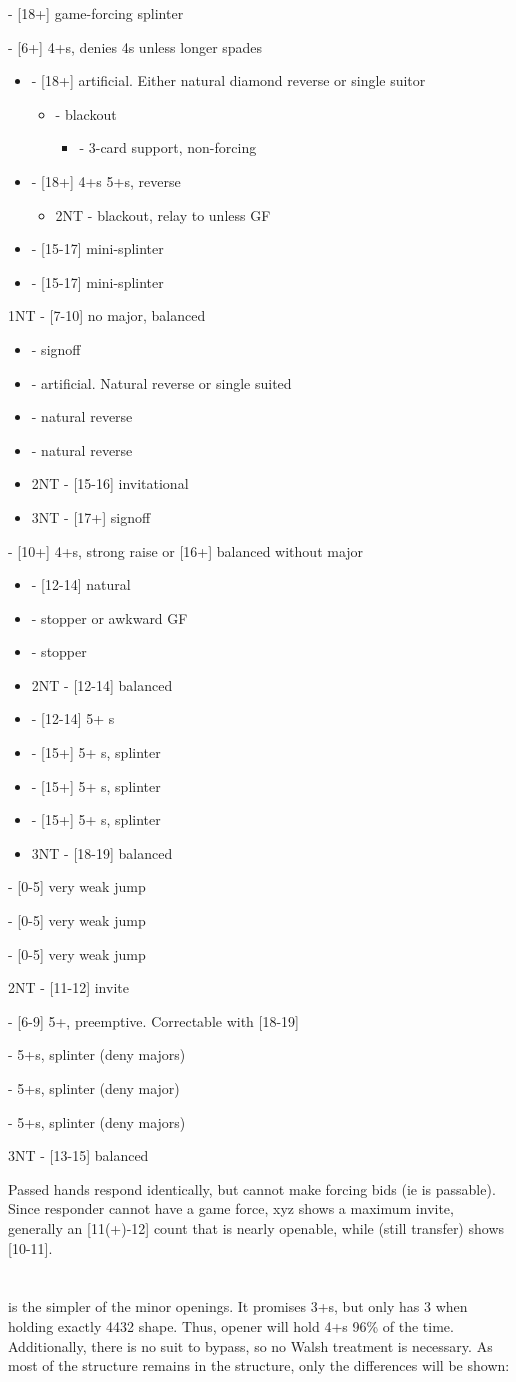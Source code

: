 \documentclass[12pt]{report}
\newcommand{\q}[1]{\multido{}{#1}{\qquad}}
\newcommand{\ul}[1]{\begin{itemize}#1\end{itemize}}
\newcommand{\li}[1]{\item[~] \q{#1}}
\newcommand{\bidsection}[2]{\section{\texorpdfstring{#1}{#2}}}
\begin{document}
\begin{center}
{{            \li0  - [18+] game-forcing splinter
        }
        \li0  - [6+] 4+\sp{}s, denies 4\he{}s unless longer spades
        \ul {
            \li0  - [18+] artificial.  Either natural diamond reverse or single suitor
            \ul {
                \li0 \he2 - blackout
                \ul {
                    \li0 \sp2 - 3-card support, non-forcing
                }
            }
            \li0 \he2 - [18+] 4+\he{}s 5+\cl{}s, reverse
            \ul {
                \li0 2NT - blackout, relay to \cl3 unless GF
            }
            \li0 \di3 - [15-17] mini-splinter
            \li0 \he3 - [15-17] mini-splinter
        }
        \li0 1NT - [7-10] no major, balanced
        \ul {
            \li0  - signoff
            \li0  - artificial.  Natural reverse or single suited
            \li0 \he2 - natural reverse
            \li0 \sp2 - natural reverse
            \li0 2NT - [15-16] invitational
            \li0 3NT - [17+] signoff
            

        }
        \li0  - [10+] 4+\cl{}s, strong raise or [16+] balanced without major
        \ul {
            \li0  - [12-14] natural
            \li0 \he2 - stopper or awkward GF
            \li0 \sp2 - stopper
            \li0 2NT - [12-14] balanced
            \li0 \cl3 - [12-14] 5+ \cl{}s
            \li0 \di3 - [15+] 5+ \cl{}s, splinter
            \li0 \he3 - [15+] 5+ \cl{}s, splinter
            \li0 \sp3 - [15+] 5+ \cl{}s, splinter
            \li0 3NT - [18-19] balanced
        }

        \li0  - [0-5] very weak jump
        \li0  - [0-5] very weak jump
        \li0  - [0-5] very weak jump
        \li0 2NT - [11-12] invite
        \li0  - [6-9] 5+\cl{}, preemptive.  Correctable with [18-19]
        \li0  - 5+\cl{}s, splinter (deny majors)
        \li0  - 5+\cl{}s, splinter (deny major)
        \li0  - 5+\cl{}s, splinter (deny majors)
        \li0 3NT - [13-15] balanced
    }

    Passed hands respond identically, but cannot make forcing bids (ie  is passable).  Since responder cannot have a game force, xyz  shows a maximum invite, generally an [11(+)-12] count that is nearly openable, while  (still transfer) shows [10-11].

\bidsection{}{1♢} \label{2:3}

     is the simpler of the minor openings.  It promises 3+\di{}s, but only has 3 when holding exactly 4432 shape.  Thus, opener will hold 4+\di{}s 96\% of the time.  Additionally, there is no suit to bypass, so no Walsh treatment is necessary.  As most of the  structure remains in the  structure, only the differences will be shown:


\end{center}
\end{document}

